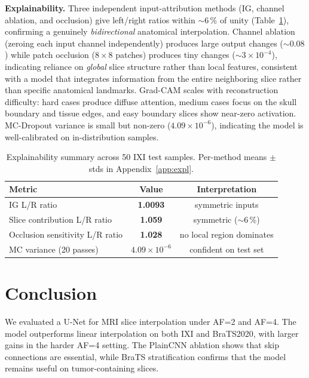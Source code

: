\documentclass{article}
\begin{document}
\textbf{Explainability.} Three independent input-attribution methods (IG, channel ablation, and occlusion) give left/right ratios within $\sim$6\,\% of unity (Table~\ref{tab:expl}), confirming a genuinely \emph{bidirectional} anatomical interpolation. Channel ablation (zeroing each input channel independently) produces large output changes ($\sim 0.08$) while patch occlusion ($8\!\times\!8$ patches) produces tiny changes ($\sim 3\!\times\!10^{-4}$), indicating reliance on \emph{global} slice structure rather than local features, consistent with a model that integrates information from the entire neighboring slice rather than specific anatomical landmarks. Grad-CAM scales with reconstruction difficulty: hard cases produce diffuse attention, medium cases focus on the skull boundary and tissue edges, and easy boundary slices show near-zero activation. MC-Dropout variance is small but non-zero ($4.09 \times 10^{-6}$), indicating the model is well-calibrated on in-distribution samples.

\begin{table}[h]
\centering
\caption{Explainability summary across 50 IXI test samples. Per-method
means $\pm$ stds in Appendix~\ref{app:expl}.}
\label{tab:expl}
\begin{tabular}{lcc}
\toprule
Metric                                & Value                         & Interpretation                \\
\midrule
IG L/R ratio                          & \textbf{1.0093}               & symmetric inputs              \\
Slice contribution L/R ratio          & \textbf{1.059}                & symmetric ($\sim$6\,\%)       \\
Occlusion sensitivity L/R ratio       & \textbf{1.028}                & no local region dominates     \\
MC variance (20 passes)               & $4.09 \times 10^{-6}$      & confident on test set         \\
\bottomrule
\end{tabular}
\end{table}

\section{Conclusion}

We evaluated a U-Net for MRI slice interpolation under AF=2 and AF=4. The model outperforms linear interpolation on both IXI and BraTS2020, with larger gains in the harder AF=4 setting. The PlainCNN ablation shows that skip connections are essential, while BraTS stratification confirms that the model remains useful on tumor-containing slices.
\end{document}
